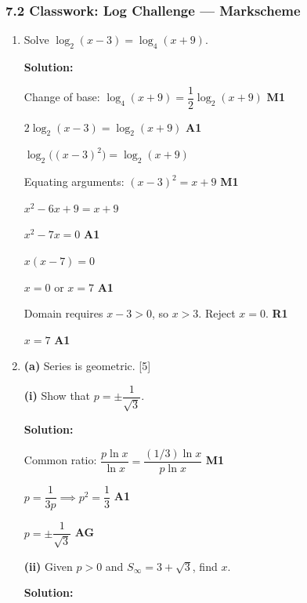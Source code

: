 \documentclass[12pt, twoside]{article}
\begin{document}
\subsubsection*{7.2 Classwork: Log Challenge --- Markscheme}

\begin{enumerate}[itemsep=0.3cm]

\item[1.] [Maximum mark: 7]

Solve $\log_2(x - 3) = \log_4(x + 9)$.

\textbf{Solution:}

Change of base: $\log_4(x+9) = \dfrac{1}{2} \log_2(x+9)$ \hfill \textbf{M1}

$2 \log_2(x-3) = \log_2(x+9)$ \hfill \textbf{A1}

$\log_2\!\bigl((x-3)^2\bigr) = \log_2(x+9)$

Equating arguments: $(x-3)^2 = x + 9$ \hfill \textbf{M1}

$x^2 - 6x + 9 = x + 9$

$x^2 - 7x = 0$ \hfill \textbf{A1}

$x(x - 7) = 0$

$x = 0$ or $x = 7$ \hfill \textbf{A1}

Domain requires $x - 3 > 0$, so $x > 3$.
Reject $x = 0$. \hfill \textbf{R1}

$x = 7$ \hfill \textbf{A1}

\newpage

\item[2.] [Maximum mark: 15]

\textbf{(a)} Series is geometric. \hfill [5]

\textbf{(i)} Show that $p = \pm \dfrac{1}{\sqrt{3}}$.

\textbf{Solution:}

Common ratio: $\dfrac{p \ln x}{\ln x} = \dfrac{(1/3)\ln x}{p \ln x}$ \hfill \textbf{M1}

$p = \dfrac{1}{3p} \implies p^2 = \dfrac{1}{3}$ \hfill \textbf{A1}

$p = \pm \dfrac{1}{\sqrt{3}}$ \hfill \textbf{AG}

\medskip

\textbf{(ii)} Given $p > 0$ and $S_{\infty} = 3 + \sqrt{3}$, find $x$.

\textbf{Solution:}


\end{enumerate}
\end{document}
